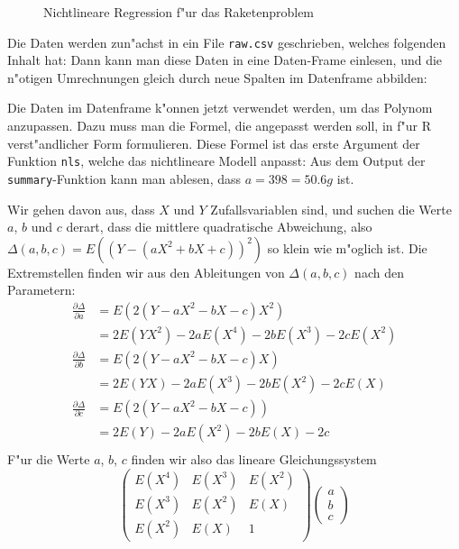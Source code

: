 \begin{figure}
\begin{center}
\end{center}
\caption{Nichtlineare Regression f"ur das Raketenproblem}
\end{figure}
\begin{loesung}
\begin{teilaufgaben}
\item
Die Daten werden zun"achst in ein File {\tt raw.csv}
geschrieben, welches folgenden Inhalt hat:
Dann kann man diese Daten in eine Daten-Frame einlesen,
und die n"otigen Umrechnungen gleich durch neue Spalten im
Datenframe abbilden:
\item
Die Daten im Datenframe k"onnen jetzt verwendet werden, um
das Polynom anzupassen. Dazu muss man die Formel, die angepasst
werden soll, in f"ur R verst"andlicher Form formulieren.
Diese Formel ist das erste Argument der Funktion {\tt nls}, welche
das nichtlineare Modell anpasst:
Aus dem Output der {\tt summary}-Funktion
kann man ablesen, dass $a=398=50.6g$ ist.
\item Wir gehen davon aus, dass $X$ und $Y$ Zufallsvariablen sind, und
suchen die Werte $a$, $b$ und $c$ derart, dass die mittlere quadratische
Abweichung, also
$\Delta(a,b,c)=E((Y-(aX^2+bX+c))^2)$ so klein wie m"oglich ist.
Die Extremstellen finden wir aus den Ableitungen von $\Delta(a,b,c)$ nach
den Parametern:
\begin{align*}
\frac{\partial \Delta}{\partial a}
&=
E(2(Y-aX^2-bX-c)X^2)
\\
&=
2E(YX^2)-2aE(X^4)-2bE(X^3)-2cE(X^2)
\\
\frac{\partial \Delta}{\partial b}
&=
E(2(Y-aX^2-bX-c)X)
\\
&=
2E(YX)-2aE(X^3)-2bE(X^2)-2cE(X)
\\
\frac{\partial \Delta}{\partial c}
&=E(2(Y-aX^2-bX-c))
\\
&=
2E(Y)-2aE(X^2)-2bE(X)-2c
\\
\end{align*}
F"ur die Werte $a$, $b$, $c$ finden wir also das lineare Gleichungssystem
\[
\begin{pmatrix}
E(X^4)&E(X^3)&E(X^2)\\
E(X^3)&E(X^2)&E(X)\\
E(X^2)&E(X)&1
\end{pmatrix}
\begin{pmatrix}
a\\b\\c

\end{pmatrix}\]
\end{teilaufgaben}
\end{loesung}
